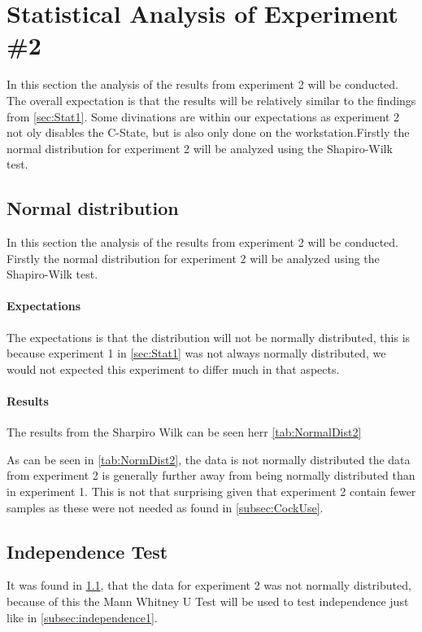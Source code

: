 \section{Statistical Analysis of Experiment \#2}\label{sec:Stat2}
In this section the analysis of the results from experiment 2 will be conducted. The overall expectation is that the results will be relatively similar to the findings from \cref{sec:Stat1}. Some divinations are within our expectations as experiment 2 not oly disables the C-State, but is also only done on the workstation.Firstly the normal distribution for experiment 2 will be analyzed using the Shapiro-Wilk test.

\subsection{Normal distribution}\label{subsec:NormalDist2}
In this section the analysis of the results from experiment 2 will be conducted. Firstly the normal distribution for experiment 2 will be analyzed using the Shapiro-Wilk test. 

\paragraph{Expectations}
The expectations is that the distribution will not be normally distributed, this is because experiment 1 in \cref{sec:Stat1} was not always normally distributed, we would not expected this experiment to differ much in that aspects. 

\paragraph{Results}
The results from the Sharpiro Wilk can be seen herr \cref{tab:NormalDist2}
 
As can be seen in \cref{tab:NormDist2}, the data is not normally distributed the data from experiment 2 is generally further away from being normally distributed than in experiment 1. This is not that surprising given that experiment 2 contain fewer samples as these were not needed as found in \cref{subsec:CockUse}.

\subsection{Independence Test}\label{subsec:independence2}
It was found in \cref{subsec:NormalDist2}, that the data for experiment 2 was not normally distributed, because of this the Mann Whitney U Test will be used to test independence just like in \cref{subsec:independence1}.


